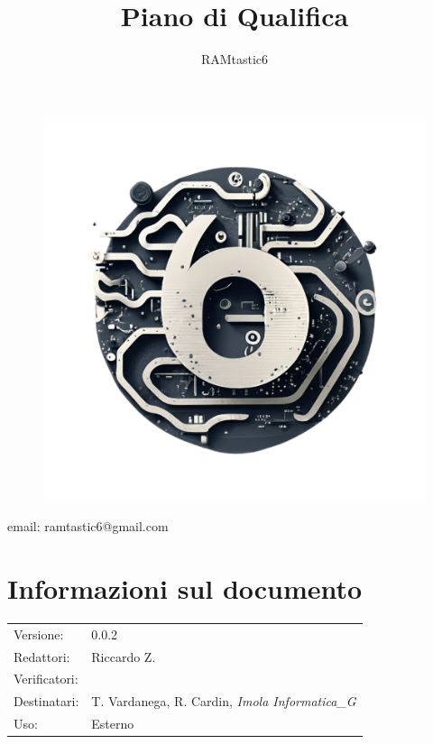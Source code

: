 \documentclass[12pt, oneside]{article}
\author{RAMtastic6}
\begin{document}
\thispagestyle{empty}
\title{Piano di Qualifica}
\maketitle
\begin{figure}[h]
  \centering
  \includegraphics[scale=0.3]{logo.png}
\end{figure}
\begin{center}
    email: ramtastic6@gmail.com
\end{center}

\section*{Informazioni sul documento}
\begin{tabular}{ll}
Versione: & 0.0.2 \\
Redattori: & Riccardo Z. \\
Verificatori: & \\ 
Destinatari: & T. Vardanega, R. Cardin, \textit{Imola Informatica_G} \\
Uso: & Esterno
\end{tabular}
\newpage

\end{document}
